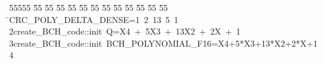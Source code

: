 %
%
\begin{tabbing}
55555 \= 55 \= 55 \= 55 \= 55 \= 55 \= 55 \= 55 \= 55 \= 55 \= 55 \= 55 \= 55 \= \>CRC\_POLY\_DELTA\_DENSE=1\ 2\ 13\ 5\ 1\\[0pt]
2\>create\_BCH\_code::init\ Q=X4\ +\ 5X3\ +\ 13X2\ +\ 2X\ +\ 1\\[0pt]
3\>create\_BCH\_code::init\ BCH\_POLYNOMIAL\_F16=X4+5*X3+13*X2+2*X+1\\[0pt]
4\>\end{tabbing}
